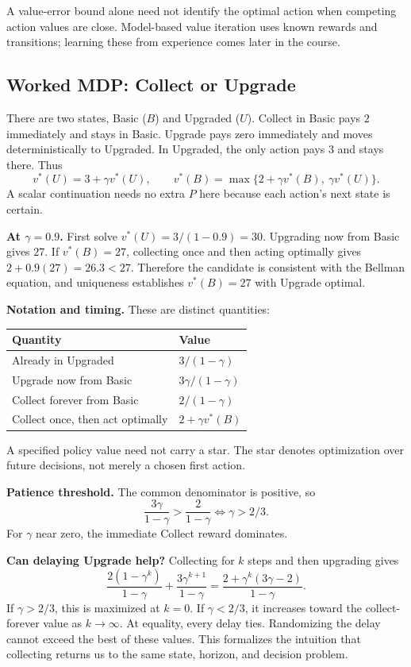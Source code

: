\documentclass[11pt]{article}
\theoremstyle{remark}\newtheorem{remark}[definition]{Remark}
\begin{document}
A value-error bound alone need not identify the optimal action when competing action values are close. Model-based value iteration uses known rewards and transitions; learning these from experience comes later in the course.

\clearpage
\subsection{Worked MDP: Collect or Upgrade}
There are two states, Basic ($B$) and Upgraded ($U$). Collect in Basic pays $2$ immediately and stays in Basic. Upgrade pays zero immediately and moves deterministically to Upgraded. In Upgraded, the only action pays $3$ and stays there. Thus
\[
v^*(U)=3+\gamma v^*(U),\qquad
v^*(B)=\max\{2+\gamma v^*(B),\ \gamma v^*(U)\}.
\]
A scalar continuation needs no extra $P$ here because each action's next state is certain.

\textbf{At $\gamma=0.9$.} First solve $v^*(U)=3/(1-0.9)=30$. Upgrading now from Basic gives $27$. If $v^*(B)=27$, collecting once and then acting optimally gives $2+0.9(27)=26.3<27$. Therefore the candidate is consistent with the Bellman equation, and uniqueness establishes $v^*(B)=27$ with Upgrade optimal.

\textbf{Notation and timing.} These are distinct quantities:
\begin{center}
\begin{tabular}{@{}ll@{}}\toprule
Quantity & Value\\\midrule
Already in Upgraded & $3/(1-\gamma)$\\
Upgrade now from Basic & $3\gamma/(1-\gamma)$\\
Collect forever from Basic & $2/(1-\gamma)$\\
Collect once, then act optimally & $2+\gamma v^*(B)$\\\bottomrule
\end{tabular}
\end{center}
A specified policy value need not carry a star. The star denotes optimization over future decisions, not merely a chosen first action.

\textbf{Patience threshold.} The common denominator is positive, so
\[
\frac{3\gamma}{1-\gamma}>\frac2{1-\gamma}\iff\gamma>2/3.
\]
For $\gamma$ near zero, the immediate Collect reward dominates.

\textbf{Can delaying Upgrade help?} Collecting for $k$ steps and then upgrading gives
\[
\frac{2(1-\gamma^k)}{1-\gamma}+\frac{3\gamma^{k+1}}{1-\gamma}
=\frac{2+\gamma^k(3\gamma-2)}{1-\gamma}.
\]
If $\gamma>2/3$, this is maximized at $k=0$. If $\gamma<2/3$, it increases toward the collect-forever value as $k\to\infty$. At equality, every delay ties. Randomizing the delay cannot exceed the best of these values. This formalizes the intuition that collecting returns us to the same state, horizon, and decision problem.
\end{document}
